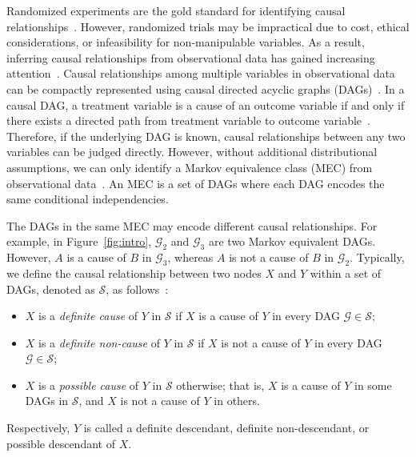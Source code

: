 \documentclass{article}
\begin{document}
Randomized experiments are the gold standard for identifying causal relationships~\citep{robins2000marginal}.
However, randomized trials may be impractical due to cost,  ethical considerations, or infeasibility for non-manipulable variables.
As a result, inferring causal relationships from observational data has gained increasing attention~\citep{cooper1997simple, cox2018modernizing}.
Causal relationships among multiple variables in observational data can be compactly represented using causal directed acyclic graphs (DAGs)~\citep{pearl1995causal, spirtes2000causation, geng2019evaluation}.
In a causal DAG, a treatment variable is a cause of an outcome variable if and only if there exists a directed path from treatment variable to outcome variable~\citep{pearl2009causality}.
Therefore, if the underlying DAG is known, causal relationships between any two variables can be judged directly.
However, without additional distributional assumptions, we can only identify a Markov equivalence class (MEC) from observational data~\citep{chickering2002learning}. An MEC is a set of DAGs where each DAG encodes the same conditional independencies.

The DAGs in the same MEC may encode different causal relationships.
For example, in Figure~\ref{fig:intro}, $\mathcal{G}_2$ and $\mathcal{G}_3$ are two Markov equivalent DAGs. However, $A$ is a cause of $B$ in $\mathcal{G}_3$, whereas $A$ is not a cause of $B$ in $\mathcal{G}_2$.
Typically, we define the causal relationship between two nodes $X$ and $Y$ within a set of DAGs, denoted as $\mathcal{S}$, as follows~\citep{fang2022local, zuo2022counterfactual}:
\begin{itemize}
    \item $X$ is a \textit{definite cause} of $Y$ in $\mathcal{S}$ if $X$ is a cause of $Y$ in every DAG $\mathcal{G}\in\mathcal{S}$;
    \item $X$ is a \textit{definite non-cause} of $Y$ in $\mathcal{S}$ if $X$ is not a cause of $Y$ in every DAG $\mathcal{G}\in\mathcal{S}$;
    \item $X$ is a \textit{possible cause} of $Y$ in $\mathcal{S}$ otherwise; that is, $X$ is a cause of $Y$ in some DAGs in $\mathcal{S}$, and $X$ is not a cause of $Y$ in others.
\end{itemize}
Respectively, $Y$ is called a definite descendant, definite non-descendant, or possible descendant of $X$.
\end{document}
